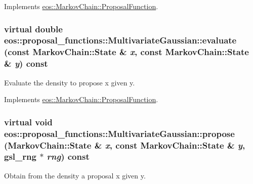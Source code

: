 Implements \hyperlink{structeos_1_1MarkovChain_1_1ProposalFunction_aea88a1340e10cc6a5b03d8b5483774f7}{eos::MarkovChain::ProposalFunction}.\hypertarget{classeos_1_1proposal__functions_1_1MultivariateGaussian_a691b0b536abdd28e3cc629c27046603d}{
\subsubsection[{evaluate}]{\setlength{\rightskip}{0pt plus 5cm}virtual double eos::proposal\_\-functions::MultivariateGaussian::evaluate (const {\bf MarkovChain::State} \& {\em x}, \/  const {\bf MarkovChain::State} \& {\em y}) const}}
\label{classeos_1_1proposal__functions_1_1MultivariateGaussian_a691b0b536abdd28e3cc629c27046603d}


Evaluate the density to propose x given y. 

Implements \hyperlink{structeos_1_1MarkovChain_1_1ProposalFunction_ae3f2c43980ec9dfe9f35d8139f2f4ec7}{eos::MarkovChain::ProposalFunction}.\hypertarget{classeos_1_1proposal__functions_1_1MultivariateGaussian_a4f451b8dc78b681eee4bda462217fb77}{
\subsubsection[{propose}]{\setlength{\rightskip}{0pt plus 5cm}virtual void eos::proposal\_\-functions::MultivariateGaussian::propose ({\bf MarkovChain::State} \& {\em x}, \/  const {\bf MarkovChain::State} \& {\em y}, \/  gsl\_\-rng $\ast$ {\em rng}) const}}
\label{classeos_1_1proposal__functions_1_1MultivariateGaussian_a4f451b8dc78b681eee4bda462217fb77}


Obtain from the density a proposal x given y. 


